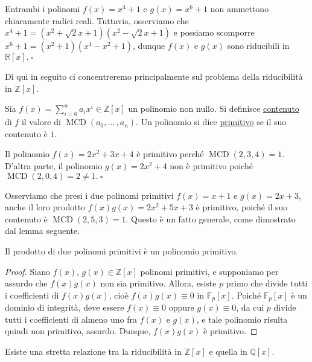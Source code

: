 \begin{exm}Entrambi i polinomi $f(x)=x^4+1$ e $g(x)=x^6+1$ non ammettono chiaramente radici reali. Tuttavia, osserviamo che $x^4+1=(x^2+\sqrt{2}x+1)(x^2-\sqrt{2}x+1)$ e possiamo scomporre $x^6+1=(x^2+1)(x^4-x^2+1)$, dunque $f(x)$ e $g(x)$ sono riducibili in $\mathbb{R}[x]. \ \square$\end{exm}

\noindent Di qui in seguito ci concentreremo principalmente sul problema della riducibilità in $\mathbb{Z}[x]$.

\begin{defn}[]{}
Sia $f(x)=\sum\limits_{i=0}^n a_i x^i \in \mathbb{Z}[x]$ un polinomio non nullo. Si definisce \underline{contenuto} di $f$ il valore di $\operatorname{MCD}(a_0,...\,,a_n)$. Un polinomio si dice \underline{primitivo} se il suo contenuto è $1$.
\end{defn}

\begin{exm}Il polinomio $f(x)=2x^2+3x+4$ è primitivo perché $\operatorname{MCD}(2,3,4)=1$. D'altra parte, il polinomio $g(x)=2x^2+4$ non è primitivo poiché $\operatorname{MCD}(2,0,4)=2\neq 1. \ \square$\end{exm}

\noindent Osserviamo che presi i due polinomi primitivi $f(x)=x+1$ e $g(x)=2x+3$, anche il loro prodotto $f(x)g(x)=2x^2+5x+3$ è primitivo, poiché il suo contenuto è $\operatorname{MCD}(2,5,3)=1$. Questo è un fatto generale, come dimostrato dal lemma seguente.

\begin{lem}{}
Il prodotto di due polinomi primitivi è un polinomio primitivo.
\end{lem}
\vspace{-4mm}
\begin{proof}
Siano $f(x),\,g(x)\in \mathbb{Z}[x]$ polinomi primitivi, e supponiamo per assurdo che $f(x)g(x)$ non sia primitivo. Allora, esiste $p$ primo che divide tutti i coefficienti di $f(x)g(x)$, cioè $f(x)g(x)\equiv 0$ in $\mathbb{F}_p[x]$. Poiché $\mathbb{F}_p[x]$ è un dominio di integrità, deve essere $f(x)\equiv 0$ oppure $g(x)\equiv 0$, da cui $p$ divide tutti i coefficienti di almeno uno fra $f(x)$ e $g(x)$, e tale polinomio risulta quindi non primitivo, assurdo. Dunque, $f(x)g(x)$ è primitivo.
\end{proof}

\noindent Esiste una stretta relazione tra la riducibilità in $\mathbb{Z}[x]$ e quella in $\mathbb{Q}[x]$.

